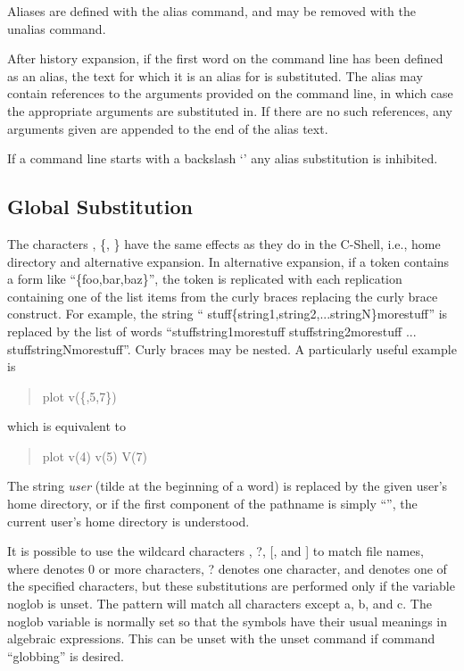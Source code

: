 
Aliases are defined with the {\cb alias} command, and may be removed
with the {\cb unalias} command.

After history expansion, if the first word on the command line has
been defined as an alias, the text for which it is an alias for is
substituted.  The alias may contain references to the arguments
provided on the command line, in which case the appropriate arguments
are substituted in.  If there are no such references, any arguments
given are appended to the end of the alias text.

If a command line starts with a backslash `{\vt {}}' any
alias substitution is inhibited.
 
\subsection{Global Substitution}


The characters {\vt {}}, \{, \} have the same effects as
they do in the C-Shell, i.e., home directory and alternative
expansion.  In alternative expansion, if a token contains a form like
``\{{\vt foo,bar,baz}\}'', the token is replicated with each
replication containing one of the list items from the curly braces
replacing the curly brace construct.  For example, the string ``{\vt
stuff}\{{\vt string1,string2,...stringN}\}{\vt morestuff}'' is
replaced by the list of words ``{\vt stuffstring1morestuff} {\vt
stuffstring2morestuff} ...  {\vt stuffstringNmorestuff}''.  Curly
braces may be nested.  A particularly useful example is
\begin{quote}
{\vt plot v(}\{{,5,7}\}{\vt )}
\end{quote}
which is equivalent to
\begin{quote}
{\vt plot v(4) v(5) V(7)}
\end{quote}

The string {\vt {}}{\it user} (tilde at the beginning of a
word) is replaced by the given user's home directory, or if the first
component of the pathname is simply ``{\vt {}}'', the
current user's home directory is understood.

It is possible to use the wildcard characters {\vt *}, {\vt ?}, {\vt
[}, and {\vt ]} to match file names, where {\vt *} denotes 0 or more
characters, {\vt ?} denotes one character, and {\vt [...]} denotes one
of the specified characters, but these substitutions are performed
only if the variable {\et noglob} is unset.  The pattern {} will match all characters except {\vt a}, {\vt b},
and {\vt c}.  The {\et noglob} variable is normally set so that the
symbols have their usual meanings in algebraic expressions.  This can
be unset with the {\cb unset} command if command ``globbing'' is
desired.

